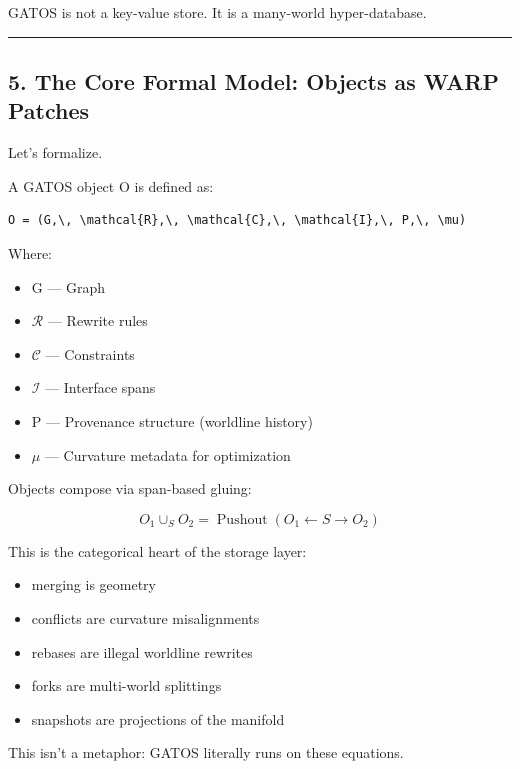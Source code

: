GATOS is not a key-value store. It is a many-world hyper-database.

\begin{center}\rule{0.5\linewidth}{0.5pt}\end{center}

\subsection{5. The Core Formal Model: Objects as WARP
Patches}\label{the-core-formal-model-objects-as-rmg-patches}

Let's formalize.

A GATOS object O is defined as:

\begin{lstlisting}
O = (G,\, \mathcal{R},\, \mathcal{C},\, \mathcal{I},\, P,\, \mu)
\end{lstlisting}

Where:

\begin{itemize}
\tightlist
\item
  G --- Graph
\item
  $\mathcal{R}$ --- Rewrite rules
\item
  $\mathcal{C}$ --- Constraints
\item
  $\mathcal{I}$ --- Interface spans
\item
  P --- Provenance structure (worldline history)
\item
  $\mu$ --- Curvature metadata for optimization
\end{itemize}

Objects compose via span-based gluing:

\[
  O_1 \cup_{S} O_2 = \operatorname{Pushout}(O_1 \leftarrow S \rightarrow O_2)
\]

This is the categorical heart of the storage layer:

\begin{itemize}
\tightlist
\item
  merging is geometry
\item
  conflicts are curvature misalignments
\item
  rebases are illegal worldline rewrites
\item
  forks are multi-world splittings
\item
  snapshots are projections of the manifold
\end{itemize}

This isn't a metaphor: GATOS literally runs on these equations.

